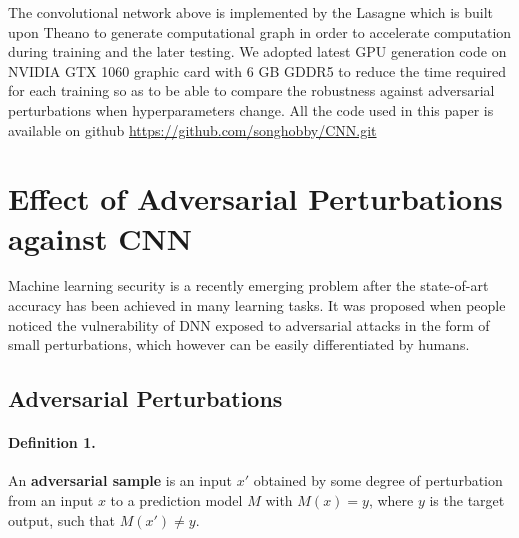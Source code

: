\documentclass{article}
\begin{document}
The convolutional network above is implemented by the Lasagne\cite{Lasagne} which is built upon Theano\cite{Theano} to generate computational graph in order to accelerate computation during training and the later testing.
We adopted latest GPU generation code on NVIDIA GTX 1060 graphic card with 6 GB GDDR5 to reduce the time required for each training so as to be able to compare the robustness against adversarial perturbations when hyperparameters change.
All the code used in this paper is available on github \url{https://github.com/songhobby/CNN.git}

\section{Effect of Adversarial Perturbations against CNN}
Machine learning security is a recently emerging problem after the state-of-art accuracy has been achieved in many learning tasks. It was proposed when people noticed the vulnerability of DNN exposed to adversarial attacks in the form of small perturbations, which however can be easily differentiated by humans.
\subsection{Adversarial Perturbations}
\paragraph{Definition 1.}
An \textbf{adversarial sample} is an input $x\prime$ obtained by some degree of perturbation from an input $x$ to a prediction model $M$ with $M(x)=y$, where $y$ is the target output, such that $M(x\prime) \ne y$.
\end{document}
